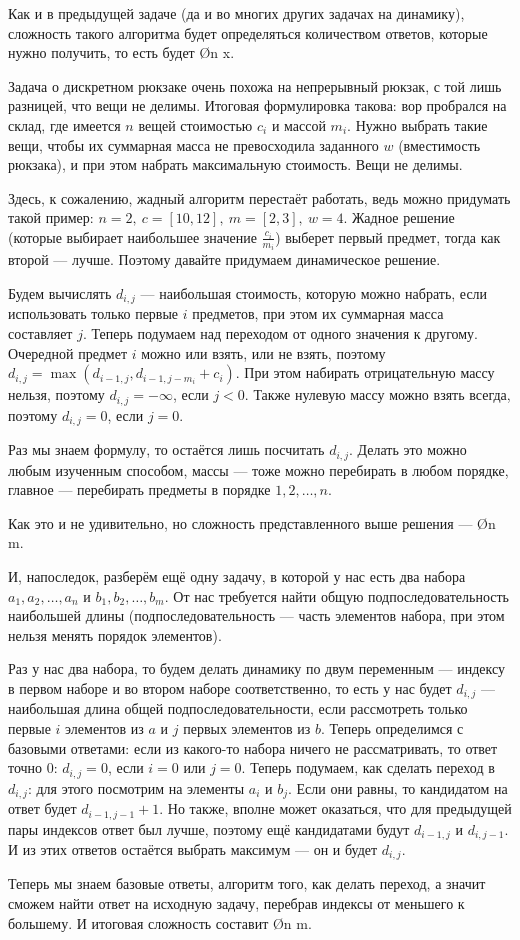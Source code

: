 Как и в предыдущей задаче (да и во многих других задачах на динамику), сложность такого алгоритма будет определяться количеством ответов, которые нужно получить, то есть будет \O{n \cdot x}.


Задача о дискретном рюкзаке очень похожа на непрерывный рюкзак, с той лишь разницей, что вещи не делимы. Итоговая формулировка такова: вор пробрался на склад, где имеется $n$ вещей стоимостью $c_i$ и массой $m_i$. Нужно выбрать такие вещи, чтобы их суммарная масса не превосходила заданного $w$ (вместимость рюкзака), и при этом набрать максимальную стоимость. Вещи не делимы.

Здесь, к сожалению, жадный алгоритм перестаёт работать, ведь можно придумать такой пример: $n = 2,\ c = [10, 12],\ m = [2, 3],\ w = 4$. Жадное решение (которые выбирает наибольшее значение $\frac{c_i}{m_i}$) выберет первый предмет, тогда как второй — лучше. Поэтому давайте придумаем динамическое решение.

Будем вычислять $d_{i, j}$ — наибольшая стоимость, которую можно набрать, если использовать только первые $i$ предметов, при этом их суммарная масса составляет $j$. Теперь подумаем над переходом от одного значения к другому. Очередной предмет $i$ можно или взять, или не взять, поэтому $d_{i, j} = \max( d_{i - 1, j}, d_{i - 1, j - m_i} + c_i)$. При этом набирать отрицательную массу нельзя, поэтому $d_{i, j} = -\infty$, если $j < 0$. Также нулевую массу можно взять всегда, поэтому $d_{i, j} = 0$, если $j = 0$.

Раз мы знаем формулу, то остаётся лишь посчитать $d_{i, j}$. Делать это можно любым изученным способом, массы — тоже можно перебирать в любом порядке, главное — перебирать предметы в порядке $1, 2, \ldots, n$.

Как это и не удивительно, но сложность представленного выше решения — \O{n \cdot m}.


И, напоследок, разберём ещё одну задачу, в которой у нас есть два набора $a_1, a_2, \ldots, a_n$ и $b_1, b_2, \ldots, b_m$. От нас требуется найти общую подпоследовательность наибольшей длины (подпоследовательность — часть элементов набора, при этом нельзя менять порядок элементов).

Раз у нас два набора, то будем делать динамику по двум переменным — индексу в первом наборе и во втором наборе соответственно, то есть у нас будет $d_{i, j}$ — наибольшая длина общей подпоследовательности, если рассмотреть только первые $i$ элементов из $a$ и $j$ первых элементов из $b$. Теперь определимся с базовыми ответами: если из какого-то набора ничего не рассматривать, то ответ точно 0: $d_{i, j} = 0$, если $i = 0$ или $j = 0$. Теперь подумаем, как сделать переход в $d_{i, j}$: для этого посмотрим на элементы $a_i$ и $b_j$. Если они равны, то кандидатом на ответ будет $d_{i - 1, j - 1} + 1$. Но также, вполне может оказаться, что для предыдущей пары индексов ответ был лучше, поэтому ещё кандидатами будут $d_{i - 1, j}$ и $d_{i, j - 1}$. И из этих ответов остаётся выбрать максимум — он и будет $d_{i, j}$.

Теперь мы знаем базовые ответы, алгоритм того, как делать переход, а значит сможем найти ответ на исходную задачу, перебрав индексы от меньшего к большему. И итоговая сложность составит \O{n \cdot m}.
